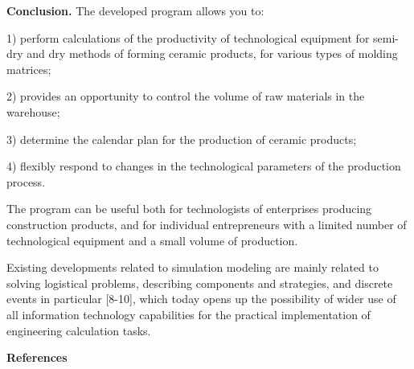 \begin{multicols}{2}


{\bfseries Conclusion.} The developed program allows you to:

1) perform calculations of the productivity of technological equipment
for semi-dry and dry methods of forming ceramic products, for various
types of molding matrices;

2) provides an opportunity to control the volume of raw materials in the
warehouse;

3) determine the calendar plan for the production of ceramic products;

4) flexibly respond to changes in the technological parameters of the
production process.

The program can be useful both for technologists of enterprises
producing construction products, and for individual entrepreneurs with a
limited number of technological equipment and a small volume of
production.

Existing developments related to simulation modeling are mainly related
to solving logistical problems, describing components and strategies,
and discrete events in particular {[}8-10{]}, which today opens up the
possibility of wider use of all information technology capabilities for
the practical implementation of engineering calculation tasks.
\end{multicols}


\begin{center}
	{\bfseries References}
	\end{center}

